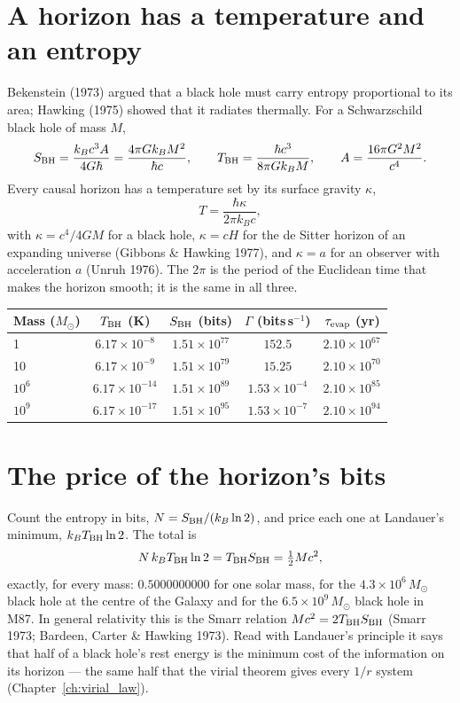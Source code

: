 \section{A horizon has a temperature and an entropy}
Bekenstein (1973) argued that a black hole must carry entropy proportional to its area; Hawking (1975) showed that it radiates thermally. For a
Schwarzschild black hole of mass $M$,
\begin{equation}
S_{\rm BH}=\frac{k_Bc^3A}{4G\hbar}=\frac{4\pi Gk_BM^2}{\hbar c},\qquad T_{\rm BH}=\frac{\hbar c^3}{8\pi Gk_BM},\qquad A=\frac{16\pi G^2M^2}{c^4}.
\end{equation}
Every causal horizon has a temperature set by its surface gravity $\kappa$,
\begin{equation}
T=\frac{\hbar\kappa}{2\pi k_Bc},
\end{equation}
with $\kappa=c^4/4GM$ for a black hole, $\kappa=cH$ for the de Sitter horizon of an expanding universe (Gibbons \& Hawking 1977), and $\kappa=a$ for an
observer with acceleration $a$ (Unruh 1976). The $2\pi$ is the period of the Euclidean time that makes the horizon smooth; it is the same in all three.

\begin{center}\small
\begin{tabular}{lcccc}
\hline
Mass ($M_\odot$) & $T_{\rm BH}$ (K) & $S_{\rm BH}$ (bits) & $\Gamma$ (bits\,s$^{-1}$) & $\tau_{\rm evap}$ (yr)\\\hline
1 & $6.17\times10^{-8}$ & $1.51\times10^{77}$ & $152.5$ & $2.10\times10^{67}$\\
10 & $6.17\times10^{-9}$ & $1.51\times10^{79}$ & $15.25$ & $2.10\times10^{70}$\\
$10^{6}$ & $6.17\times10^{-14}$ & $1.51\times10^{89}$ & $1.53\times10^{-4}$ & $2.10\times10^{85}$\\
$10^{9}$ & $6.17\times10^{-17}$ & $1.51\times10^{95}$ & $1.53\times10^{-7}$ & $2.10\times10^{94}$\\\hline
\end{tabular}
\end{center}

\section{The price of the horizon's bits}
Count the entropy in bits, $N=S_{\rm BH}/(k_B\ln2)$, and price each one at Landauer's minimum, $k_BT_{\rm BH}\ln2$. The total is
\begin{equation}
N\,k_BT_{\rm BH}\ln2=T_{\rm BH}S_{\rm BH}=\tfrac12Mc^2 ,
\end{equation}
exactly, for every mass: $0.5000000000$ for one solar mass, for the $4.3\times10^6\,M_\odot$ black hole at the centre of the Galaxy and for the
$6.5\times10^9\,M_\odot$ black hole in M87. In general relativity this is the Smarr relation $Mc^2=2T_{\rm BH}S_{\rm BH}$ (Smarr 1973; Bardeen, Carter \&
Hawking 1973). Read with Landauer's principle it says that half of a black hole's rest energy is the minimum cost of the information on its horizon --- the
same half that the virial theorem gives every $1/r$ system (Chapter~\ref{ch:virial_law}).

